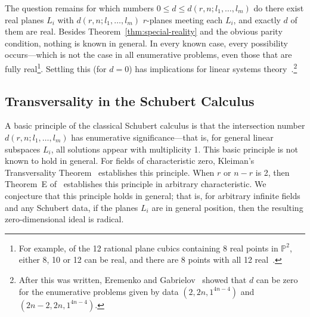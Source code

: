 The question remains for which numbers $0\leq d\leq d(r,n;l_1,\ldots,l_m)$ do
there exist real planes $L_i$ with $d(r,n;l_1,\ldots,l_m)$
$r$-planes meeting each $L_i$, and exactly $d$ of them are real.
Besides Theorem~\ref{thm:special-reality} and the obvious parity condition,
nothing is known in general.
In every known case, every possibility occurs---which is not the case in all
enumerative problems, even those that are fully real\footnote{For example, of
the 12 rational plane cubics containing 8 real points in ${\mathbb P}^2$,
either 8, 10 or 12 can be real, and there are 8 points with all 12
real~\cite[Proposition 4.7.3]{SO:DeKh00}.}.
Settling this (for $d=0$) has implications for linear systems
theory~\cite{SO:RS98}.\footnote{After this was written, Eremenko and
Gabrielov~\cite{SO:EG-NR} showed that $d$ can be zero for the enumerative 
problems given by data $(2,2n,1^{4n-4})$ and  $(2n-2,2n,1^{4n-4})$.}

\subsection{Transversality in the Schubert Calculus}
A basic principle of the classical Schubert calculus
is that the intersection 
number $d(r,n;l_1,\ldots,l_m)$ has enumerative significance---that is, for
general linear subspaces $L_i$, all solutions appear with multiplicity 1.
This basic principle is not known to hold in general.
For fields of characteristic zero, Kleiman's Transversality
Theorem~\cite{SO:MR50:13063} establishes this principle.
When $r$ or $n{-}r$ is 2, then Theorem~E of~\cite{SO:So97a} establishes this
principle in arbitrary characteristic.
We conjecture that this principle holds in general; that is, for arbitrary
infinite fields and any Schubert data, if the planes $L_i$ are in general
position, then the resulting zero-dimensional ideal is
radical. 

